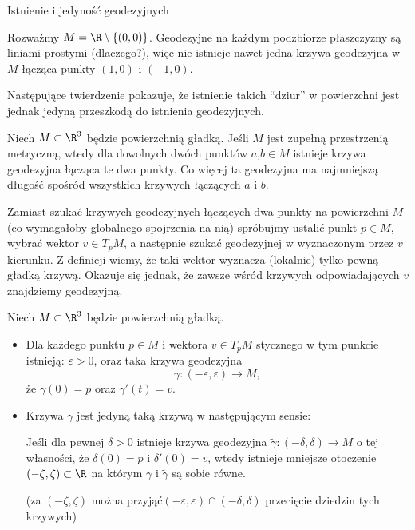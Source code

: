 \begin{frame}{Istnienie i jedyność geodezyjnych}
\begin{przyklad}
Rozważmy $M=\R\setminus\{(0,0)\}$. Geodezyjne na każdym podzbiorze płaszczyzny są liniami prostymi (dlaczego?), więc nie istnieje nawet jedna krzywa geodezyjna w $M$ łącząca punkty $(1,0)$ i $(-1,0)$.
\end{przyklad}

\pause Następujące twierdzenie pokazuje, że istnienie takich ``dziur'' w powierzchni jest jednak jedyną przeszkodą do istnienia geodezyjnych.

\end{frame}
\begin{frame}
\begin{twierdzenie}
Niech $M\subset \R^3$ będzie powierzchnią gładką. Jeśli $M$ jest zupełną przestrzenią metryczną, wtedy dla dowolnych dwóch punktów $a$,$b\in M$ istnieje krzywa geodezyjna łącząca te dwa punkty. Co więcej ta geodezyjna ma najmniejszą długość spośród wszystkich krzywych łączących $a$ i $b$.
\end{twierdzenie}

\pause
Zamiast szukać krzywych geodezyjnych łączących dwa punkty na powierzchni $M$ (co wymagałoby globalnego spojrzenia na nią) spróbujmy ustalić punkt $p\in M$, wybrać wektor $v\in T_pM$, a następnie szukać geodezyjnej w wyznaczonym przez $v$ kierunku. \pause Z definicji wiemy, że taki wektor wyznacza (lokalnie) tylko pewną gładką krzywą. Okazuje się jednak, że zawsze wśród krzywych odpowiadających $v$ znajdziemy geodezyjną.
\end{frame}
\begin{frame}

\begin{twierdzenie}
Niech $M\subset \R^3$ będzie powierzchnią gładką.
\begin{itemize}
\item Dla każdego punktu $p\in M$ i wektora $v\in T_pM$ stycznego w tym punkcie istnieją: $\varepsilon>0$, oraz taka krzywa geodezyjna \[\gamma\colon(-\varepsilon,\varepsilon)\to M,\]że $\gamma(0)=p$ oraz $\gamma'(t)=v$. 
\pause \item Krzywa $\gamma$ jest jedyną taką krzywą w następującym sensie:

Jeśli dla pewnej $\delta>0$ istnieje krzywa geodezyjna $\widetilde{{\gamma}}\colon (-\delta,\delta)\to M$ o tej własności, że $\delta(0)=p$ i $\delta'(0)=v$, wtedy istnieje mniejsze otoczenie $(-\zeta,\zeta)\subset \R$ na którym $\gamma$ i $\widetilde{\gamma}$ są sobie równe. 

\pause (za $(-\zeta,\zeta)$ można przyjąć$(-\varepsilon,\varepsilon)\cap(-\delta,\delta)$ przecięcie dziedzin tych krzywych)
\end{itemize}
\end{twierdzenie}

\end{frame}
